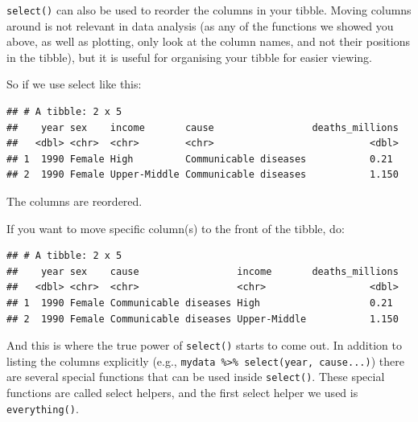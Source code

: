 \documentclass[
  12pt,
  krantz2]{krantz}
\makeatletter
\newenvironment{Shaded}{\begin{snugshade}}{\end{snugshade}}
\newcommand{\KeywordTok}[1]{\textcolor[rgb]{0.13,0.29,0.53}{\textbf{#1}}}
\newcommand{\NormalTok}[1]{#1}
\newcommand{\OperatorTok}[1]{\textcolor[rgb]{0.81,0.36,0.00}{\textbf{#1}}}
\newcommand{\StringTok}[1]{\textcolor[rgb]{0.31,0.60,0.02}{#1}}
\newenvironment{kframe}{%
\medskip{}
\setlength{\fboxsep}{.8em}
 \def\at@end@of@kframe{}%
 \ifinner\ifhmode%
  \def\at@end@of@kframe{\end{minipage}}%
  \begin{minipage}{\columnwidth}%
 \fi\fi%
 \def\FrameCommand##1{\hskip\@totalleftmargin \hskip-\fboxsep
 \colorbox{shadecolor}{##1}\hskip-\fboxsep
     \hskip-\linewidth \hskip-\@totalleftmargin \hskip\columnwidth}%
 \MakeFramed {\advance\hsize-\width
   \@totalleftmargin\z@ \linewidth\hsize
   \@setminipage}}%
 {\par\unskip\endMakeFramed%
 \at@end@of@kframe}
\renewenvironment{Shaded}{\begin{kframe}}{\end{kframe}}
\makeatother
\begin{document}
\texttt{select()} can also be used to reorder the columns in your tibble. Moving columns around is not relevant in data analysis (as any of the functions we showed you above, as well as plotting, only look at the column names, and not their positions in the tibble), but it is useful for organising your tibble for easier viewing.

So if we use select like this:

\begin{Shaded}
\end{Shaded}

\begin{verbatim}
## # A tibble: 2 x 5
##    year sex    income       cause                 deaths_millions
##   <dbl> <chr>  <chr>        <chr>                           <dbl>
## 1  1990 Female High         Communicable diseases           0.21 
## 2  1990 Female Upper-Middle Communicable diseases           1.150
\end{verbatim}

The columns are reordered.

If you want to move specific column(s) to the front of the tibble, do:

\begin{Shaded}
\end{Shaded}

\begin{verbatim}
## # A tibble: 2 x 5
##    year sex    cause                 income       deaths_millions
##   <dbl> <chr>  <chr>                 <chr>                  <dbl>
## 1  1990 Female Communicable diseases High                   0.21 
## 2  1990 Female Communicable diseases Upper-Middle           1.150
\end{verbatim}

And this is where the true power of \texttt{select()} starts to come out.
In addition to listing the columns explicitly (e.g., \texttt{mydata\ \%\textgreater{}\%\ select(year,\ cause...)}) there are several special functions that can be used inside \texttt{select()}.
These special functions are called select helpers, and the first select helper we used is \texttt{everything()}.
\end{document}
